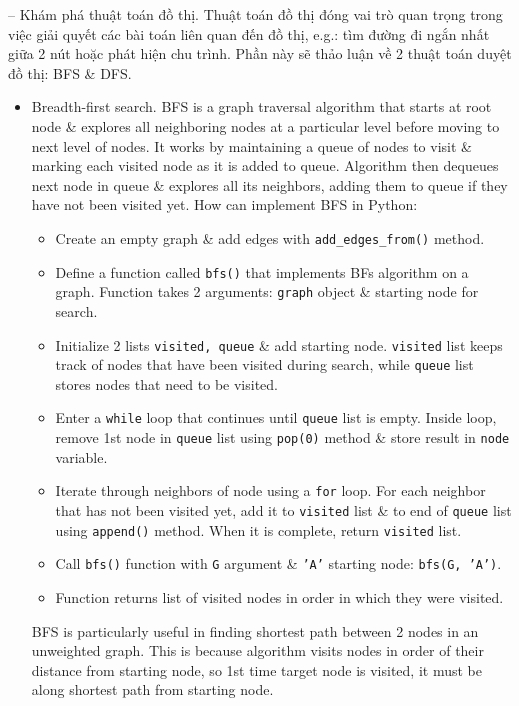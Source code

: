 \documentclass{article}
\begin{document}
\begin{itemize}
\begin{itemize}
        -- {\sf Khám phá thuật toán đồ thị.} Thuật toán đồ thị đóng vai trò quan trọng trong việc giải quyết các bài toán liên quan đến đồ thị, e.g.: tìm đường đi ngắn nhất giữa 2 nút hoặc phát hiện chu trình. Phần này sẽ thảo luận về 2 thuật toán duyệt đồ thị: BFS \& DFS.
        \begin{itemize}
            \item {\sf Breadth-first search.} BFS is a graph traversal algorithm that starts at root node \& explores all neighboring nodes at a particular level before moving to next level of nodes. It works by maintaining a queue of nodes to visit \& marking each visited node as it is added to queue. Algorithm then dequeues next node in queue \& explores all its neighbors, adding them to queue if they have not been visited yet. How can implement BFS in Python:
            \begin{itemize}
                \item Create an empty graph \& add edges with \verb|add_edges_from()| method.
                \item Define a function called {\tt bfs()} that implements BFs algorithm on a graph. Function takes 2 arguments: {\tt graph} object \& starting node for search.
                \item Initialize 2 lists {\tt visited, queue} \& add starting node. {\tt visited} list keeps track of nodes that have been visited during search, while {\tt queue} list stores nodes that need to be visited.
                \item Enter a {\tt while} loop that continues until {\tt queue} list is empty. Inside loop, remove 1st node in {\tt queue} list using {\tt pop(0)} method \& store result in {\tt node} variable.
                \item Iterate through neighbors of node using a {\tt for} loop. For each neighbor that has not been visited yet, add it to {\tt visited} list \& to end of {\tt queue} list using {\tt append()} method. When it is complete, return {\tt visited} list.
                \item Call {\tt bfs()} function with {\tt G} argument \& {\tt'A'} starting node: {\tt bfs(G, 'A')}.
                \item Function returns list of visited nodes in order in which they were visited.
            \end{itemize}
            BFS is particularly useful in finding shortest path between 2 nodes in an unweighted graph. This is because algorithm visits nodes in order of their distance from starting node, so 1st time target node is visited, it must be along shortest path from starting node.


\end{itemize}
\end{itemize}
\end{itemize}
\end{document}
